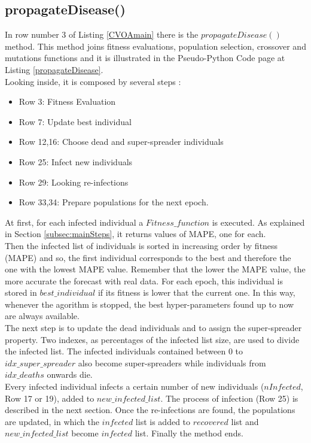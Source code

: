 \documentclass[letterpaper]{article}%
\begin{document}
\subsection{propagateDisease()}
In row number 3 of Listing \ref{CVOAmain} there is the $propagateDisease()$ method. This method joins fitness evaluations, population selection, crossover and mutations functions and it is illustrated in the Pseudo-Python Code page at Listing \ref{propagateDisease}.\\
Looking inside, it is composed by several steps :
\begin{itemize}
\item Row 3: Fitness Evaluation  
\item Row 7: Update best individual
\item Row 12,16: Choose dead and super-spreader individuals
\item Row 25: Infect new individuals
\item Row 29: Looking re-infections
\item Row 33,34: Prepare populations for the next epoch.
\end{itemize}
At first, for each infected individual a $Fitness\_function$ is executed. As explained in Section \ref{subsec:mainSteps}, it returns values of MAPE, one for each.\\ %
Then the infected list of individuals is sorted in increasing order by fitness (MAPE) and so, the first individual corresponds to the best and therefore the one with the lowest MAPE value. Remember that the lower the MAPE value, the more accurate the forecast with real data.
For each epoch, this individual is stored in $best\_individual$ if its fitness is lower that the current one. In this way, whenever the agorithm is stopped, the best hyper-parameters found up to now are always available.\\
The next step is to update the dead individuals and to assign the super-spreader property. Two indexes, as percentages of the infected list size, are used to divide the infected list. The infected individuals contained between $0$ to $idx\_super\_spreader$ also become super-spreaders while individuals from $idx\_deaths$ onwards die.\\
Every infected individual infects a certain number of new individuals ($nInfected$, Row 17 or 19), added to $new\_infected\_list$. The process of infection (Row 25) is described in the next section. Once the re-infections are found, the populations are updated, in which the $infected$ list is added to $recovered$ list and $new\_infected\_list$ become $infected$ list. Finally the method ends.
\end{document}
